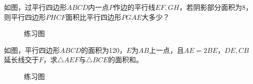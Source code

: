 \begin{problem}
如图，过平行四边形$𝐴𝐵𝐶𝐷$内一点$P$作边的平行线$EF,GH$，若阴影部分面积为$8$，则平行四边形$PHCF$面积比平行四边形$PGAE$大多少？
\end{problem}
\begin{figure}[H]
    \centering
    \resizebox{4cm}{!}{}
    \caption{练习图}
\end{figure}
\begin{problem}
如图，平行四边形$ABCD$的面积为120，$E$为$AB$上一点，且$AE=2BE$，$DE,CB$延长线交于$F$，求$\triangle AEF$与$\triangle BCE$的面积和。
\end{problem}
\begin{figure}[H]
    \centering
    \resizebox{4cm}{!}{}
    \caption{练习图}
\end{figure}
\clearpage
